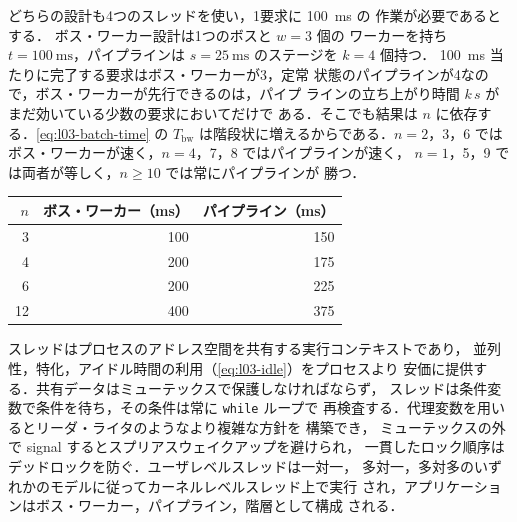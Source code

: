 \documentclass[../main.tex]{subfiles}
\begin{document}
\begin{example}
  どちらの設計も4つのスレッドを使い，1要求に \SI{100}{\milli\second} の
  作業が必要であるとする．%
  ボス・ワーカー設計は1つのボスと $w=3$ 個の
  ワーカーを持ち $t=\SI{100}{\milli\second}$，パイプラインは
  $s=\SI{25}{\milli\second}$ のステージを $k=4$ 個持つ．
  \SI{100}{\milli\second} 当たりに完了する要求はボス・ワーカーが3，定常
  状態のパイプラインが4なので，ボス・ワーカーが先行できるのは，パイプ
  ラインの立ち上がり時間 $k\,s$ がまだ効いている少数の要求においてだけで
  ある．そこでも結果は $n$ に依存する．\cref{eq:l03-batch-time} の
  $T_{\mathrm{bw}}$ は階段状に増えるからである．$n = 2$，3，6 では
  ボス・ワーカーが速く，$n = 4$，7，8 ではパイプラインが速く，
  $n = 1$，5，9 では両者が等しく，$n \geq 10$ では常にパイプラインが
  勝つ．
  \begin{center}
    \small
    \begin{tabular}{@{}rrr@{}}
      \toprule
      $n$ & ボス・ワーカー（\si{\milli\second}） & パイプライン（\si{\milli\second}） \\
      \midrule
       3 & 100 & 150 \\
       4 & 200 & 175 \\
       6 & 200 & 225 \\
      12 & 400 & 375 \\
      \bottomrule
    \end{tabular}
  \end{center}
\end{example}

\begin{keypoint}[章のまとめ]
  スレッドはプロセスのアドレス空間を共有する実行コンテキストであり，
  並列性，特化，アイドル時間の利用（\cref{eq:l03-idle}）をプロセスより
  安価に提供する．共有データはミューテックスで保護しなければならず，
  スレッドは条件変数で条件を待ち，その条件は常に \texttt{while} ループで
  再検査する．代理変数を用いるとリーダ・ライタのようなより複雑な方針を
  構築でき，
  ミューテックスの外で signal するとスプリアスウェイクアップを避けられ，
  一貫したロック順序はデッドロックを防ぐ．ユーザレベルスレッドは一対一，
  多対一，多対多のいずれかのモデルに従ってカーネルレベルスレッド上で実行
  され，アプリケーションはボス・ワーカー，パイプライン，階層として構成
  される．
\end{keypoint}
\end{document}
